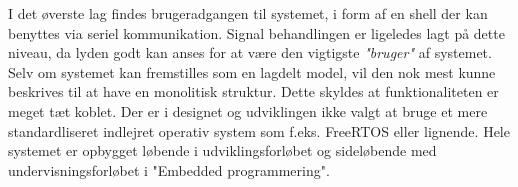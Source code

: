 I det øverste lag findes brugeradgangen til systemet, i form af en shell der kan benyttes via seriel kommunikation.
Signal behandlingen er ligeledes lagt på dette niveau, da lyden godt kan anses for at være den vigtigste \textit{"bruger"} af systemet.\\

Selv om systemet kan fremstilles som en lagdelt model, vil den nok mest kunne beskrives til at have en monolitisk struktur.
Dette skyldes at funktionaliteten er meget tæt koblet.
Der er i designet og udviklingen ikke valgt at bruge et mere standardliseret indlejret operativ system som f.eks. FreeRTOS eller lignende.
Hele systemet er opbygget løbende i udviklingsforløbet og sideløbende med undervisningsforløbet i "Embedded programmering".

\FloatBlock